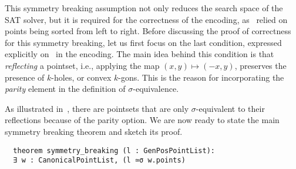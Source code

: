 This symmetry breaking assumption not only reduces the search space of the SAT solver, but it is required for the correctness of the encoding, as~ relied on points being sorted from left to right.
Before discussing the proof of correctness for this symmetry breaking, let us first focus on the last condition, expressed explicitly on~ in the encoding. The main idea behind this condition is that \emph{reflecting} a pointset, i.e., applying the map $(x, y) \mapsto (-x, y)$, preserves the presence of $k$-holes, or convex $k$-gons. This is the reason for incorporating the \emph{parity} element in the definition of $\sigma$-equivalence. 

As illustrated in~, there are pointsets that are only $\sigma$-equivalent to their reflections because of the parity option. We are now ready to state the main symmetry breaking theorem and sketch its proof.



\begin{lstlisting}
  theorem symmetry_breaking (l : GenPosPointList):
  ∃ w : CanonicalPointList, (l ≃σ w.points)
\end{lstlisting}

